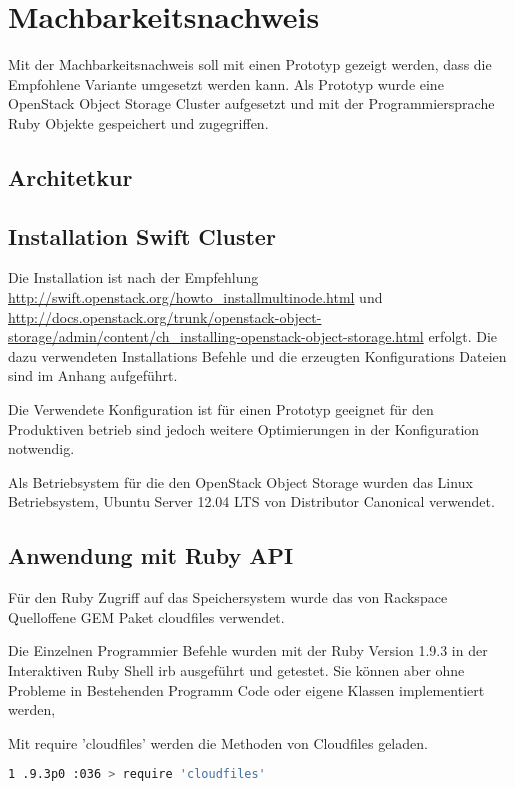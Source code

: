 \cleardoublepage
\chapter{Machbarkeitsnachweis}
Mit der Machbarkeitsnachweis soll mit einen Prototyp gezeigt werden, dass die Empfohlene Variante umgesetzt werden kann. Als Prototyp wurde eine OpenStack Object Storage Cluster aufgesetzt und mit der Programmiersprache Ruby Objekte gespeichert und zugegriffen.

\section{Architetkur}

\section{Installation Swift Cluster}

Die Installation ist nach der Empfehlung \url{http://swift.openstack.org/howto_installmultinode.html} und \url{http://docs.openstack.org/trunk/openstack-object-storage/admin/content/ch_installing-openstack-object-storage.html} erfolgt. Die dazu verwendeten Installations Befehle und die erzeugten Konfigurations Dateien sind im Anhang aufgeführt.

Die Verwendete Konfiguration ist für einen Prototyp geeignet für den Produktiven betrieb sind jedoch weitere Optimierungen in der Konfiguration notwendig.

Als Betriebsystem für die den OpenStack Object Storage wurden das Linux Betriebsystem, Ubuntu Server 12.04 LTS von Distributor Canonical verwendet.
  
  
\section{Anwendung mit Ruby API}
Für den Ruby Zugriff auf das Speichersystem wurde das von Rackspace Quelloffene GEM Paket cloudfiles verwendet.

Die Einzelnen Programmier Befehle wurden mit der Ruby Version 1.9.3 in der Interaktiven Ruby Shell irb ausgeführt und getestet. Sie können aber ohne Probleme in Bestehenden Programm Code oder eigene Klassen implementiert werden,
 
Mit require 'cloudfiles' werden die Methoden von Cloudfiles geladen.
\begin{lstlisting}[label=requireCloudfiles, language=Bash, caption=Laden ] 
 1 .9.3p0 :036 > require 'cloudfiles'
\end{lstlisting}

